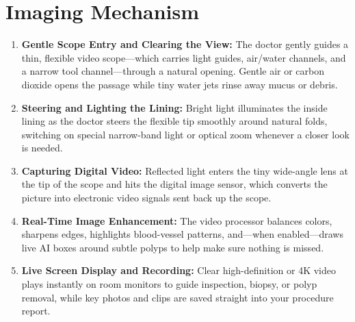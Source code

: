 \section{Imaging Mechanism}
\begin{enumerate}
\item \textbf{Gentle Scope Entry and Clearing the View:} The doctor gently guides a thin, flexible video scope---which carries light guides, air/water channels, and a narrow tool channel---through a natural opening. Gentle air or carbon dioxide opens the passage while tiny water jets rinse away mucus or debris.
\item \textbf{Steering and Lighting the Lining:} Bright light illuminates the inside lining as the doctor steers the flexible tip smoothly around natural folds, switching on special narrow-band light or optical zoom whenever a closer look is needed.
\item \textbf{Capturing Digital Video:} Reflected light enters the tiny wide-angle lens at the tip of the scope and hits the digital image sensor, which converts the picture into electronic video signals sent back up the scope.
\item \textbf{Real-Time Image Enhancement:} The video processor balances colors, sharpens edges, highlights blood-vessel patterns, and---when enabled---draws live AI boxes around subtle polyps to help make sure nothing is missed.
\item \textbf{Live Screen Display and Recording:} Clear high-definition or 4K video plays instantly on room monitors to guide inspection, biopsy, or polyp removal, while key photos and clips are saved straight into your procedure report.
\end{enumerate}


